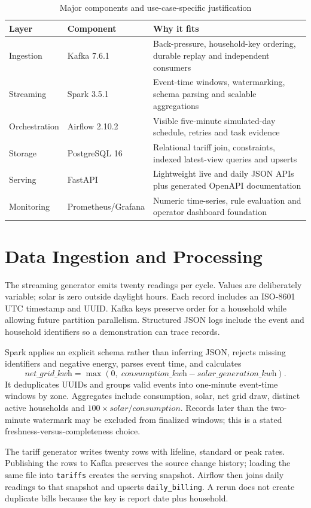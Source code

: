 \documentclass[11pt,a4paper]{article}
\newcommand{\code}[1]{\texttt{#1}}
\begin{document}
\begin{table}[H]\centering\small
\caption{Major components and use-case-specific justification}
\begin{tabularx}{\textwidth}{p{}p{}X}\toprule Layer & Component & Why it fits \\\midrule
Ingestion & Kafka 7.6.1 & Back-pressure, household-key ordering, durable replay and independent consumers\\
Streaming & Spark 3.5.1 & Event-time windows, watermarking, schema parsing and scalable aggregations\\
Orchestration & Airflow 2.10.2 & Visible five-minute simulated-day schedule, retries and task evidence\\
Storage & PostgreSQL 16 & Relational tariff join, constraints, indexed latest-view queries and upserts\\
Serving & FastAPI & Lightweight live and daily JSON APIs plus generated OpenAPI documentation\\
Monitoring & Prometheus/Grafana & Numeric time-series, rule evaluation and operator dashboard foundation\\\bottomrule
\end{tabularx}\end{table}

\section{Data Ingestion and Processing}
The streaming generator emits twenty readings per cycle. Values are deliberately variable; solar is zero outside daylight hours. Each record includes an ISO-8601 UTC timestamp and UUID. Kafka keys preserve order for a household while allowing future partition parallelism. Structured JSON logs include the event and household identifiers so a demonstration can trace records.

Spark applies an explicit schema rather than inferring JSON, rejects missing identifiers and negative energy, parses event time, and calculates
\[
\textit{net\_grid\_kwh}=\max(0,\;\textit{consumption\_kwh}-\textit{solar\_generation\_kwh}).
\]
It deduplicates UUIDs and groups valid events into one-minute event-time windows by zone. Aggregates include consumption, solar, net grid draw, distinct active households and $100\times solar/consumption$. Records later than the two-minute watermark may be excluded from finalized windows; this is a stated freshness-versus-completeness choice.

The tariff generator writes twenty rows with lifeline, standard or peak rates. Publishing the rows to Kafka preserves the source change history; loading the same file into \code{tariffs} creates the serving snapshot. Airflow then joins daily readings to that snapshot and upserts \code{daily\_billing}. A rerun does not create duplicate bills because the key is report date plus household.
\end{document}
